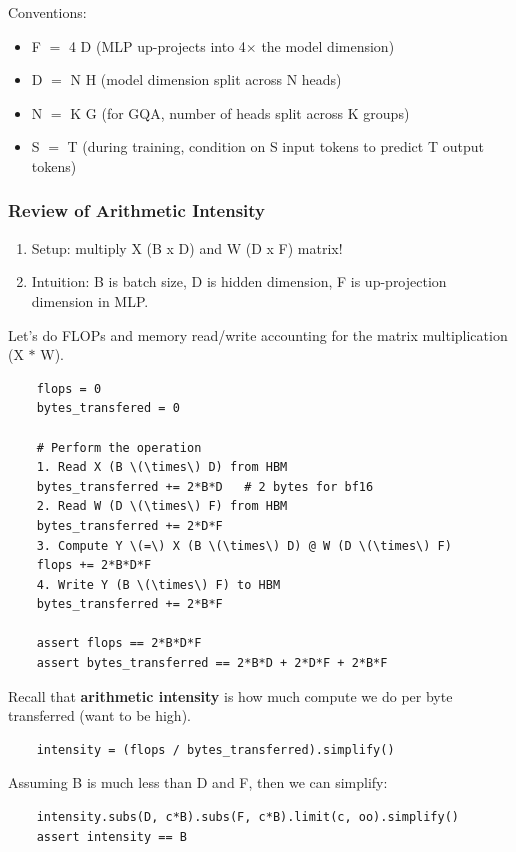 \documentclass[12pt,twoside]{article}
\begin{document}
Conventions:
\begin{itemize}
    \item F \(=\) 4 D (MLP up-projects into 4\(\times\) the model dimension)
    \item D \(=\) N H (model dimension split across N heads)
    \item N \(=\) K G (for GQA, number of heads split across K groups)
    \item S \(=\) T (during training, condition on S input tokens to predict T output tokens)
\end{itemize}

\subsubsection*{Review of Arithmetic Intensity}

\begin{enumerate}
    \item Setup: multiply X (B x D) and W (D x F) matrix!
    \item Intuition: B is batch size, D is hidden dimension, F is up-projection dimension in MLP.
\end{enumerate}

Let's do FLOPs and memory read/write accounting for the matrix multiplication (X \(*\) W).

\begin{verbatim}
    flops = 0
    bytes_transfered = 0
    
    # Perform the operation
    1. Read X (B \(\times\) D) from HBM
    bytes_transferred += 2*B*D   # 2 bytes for bf16
    2. Read W (D \(\times\) F) from HBM
    bytes_transferred += 2*D*F
    3. Compute Y \(=\) X (B \(\times\) D) @ W (D \(\times\) F)
    flops += 2*B*D*F
    4. Write Y (B \(\times\) F) to HBM
    bytes_transferred += 2*B*F
    
    assert flops == 2*B*D*F
    assert bytes_transferred == 2*B*D + 2*D*F + 2*B*F
\end{verbatim}

Recall that \textbf{arithmetic intensity} is how much compute we do per byte transferred (want to be high).

\begin{verbatim}
    intensity = (flops / bytes_transferred).simplify()
\end{verbatim}

Assuming B is much less than D and F, then we can simplify:

\begin{verbatim}
    intensity.subs(D, c*B).subs(F, c*B).limit(c, oo).simplify()  
    assert intensity == B
\end{verbatim}
\end{document}
